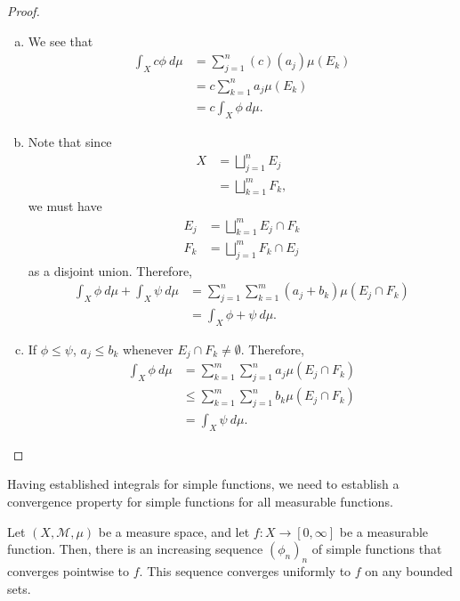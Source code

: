 \documentclass[12pt]{mypackage}
\begin{document}
\begin{proof}\hfill
  \begin{enumerate}[(a)]
    \item We see that
      \begin{align*}
        \int_{X}^{} c\phi\:d\mu &= \sum_{j=1}^{n}(c)\left( a_j \right)\mu\left( E_k \right)\\
                                &= c\sum_{k=1}^{n}a_j\mu\left( E_k \right)\\
                                &= c \int_{X}^{} \phi\:d\mu.
      \end{align*}
    \item Note that since
      \begin{align*}
        X &= \bigsqcup_{j=1}^{n}E_j\\
          &= \bigsqcup_{k=1}^{m}F_k,
      \end{align*}
      we must have
      \begin{align*}
        E_j &= \bigsqcup_{k=1}^{m}E_j\cap F_k\\
        F_k &= \bigsqcup_{j=1}^{m}F_k\cap E_j
      \end{align*}
      as a disjoint union. Therefore,
      \begin{align*}
        \int_{X}^{} \phi\:d\mu + \int_{X}^{} \psi\:d\mu &= \sum_{j=1}^{n}\sum_{k=1}^{m}\left( a_j + b_k \right)\mu\left( E_j\cap F_k \right)\\
                                                        &= \int_{X}^{} \phi + \psi\:d\mu.
      \end{align*}
    \item If $\phi\leq \psi$, $a_j\leq b_k$ whenever $E_j\cap F_k\neq \emptyset$. Therefore,
      \begin{align*}
        \int_{X}^{} \phi\:d\mu &= \sum_{k=1}^{m}\sum_{j=1}^{n}a_j\mu\left( E_j\cap F_k \right)\\
                               &\leq \sum_{k=1}^{m}\sum_{j=1}^{n}b_k\mu\left( E_j\cap F_k \right)\\
                               &= \int_{X}^{} \psi\:d\mu.
      \end{align*}
  \end{enumerate}
\end{proof}
Having established integrals for simple functions, we need to establish a convergence property for simple functions for all measurable functions.
\begin{theorem}
  Let $\left( X,\mathcal{M},\mu \right)$ be a measure space, and let $f\colon X\rightarrow [0,\infty]$ be a measurable function. Then, there is an increasing sequence $\left( \phi_n \right)_n$ of simple functions that converges pointwise to $f$. This sequence converges uniformly to $f$ on any bounded sets.
\end{theorem}
\end{document}
